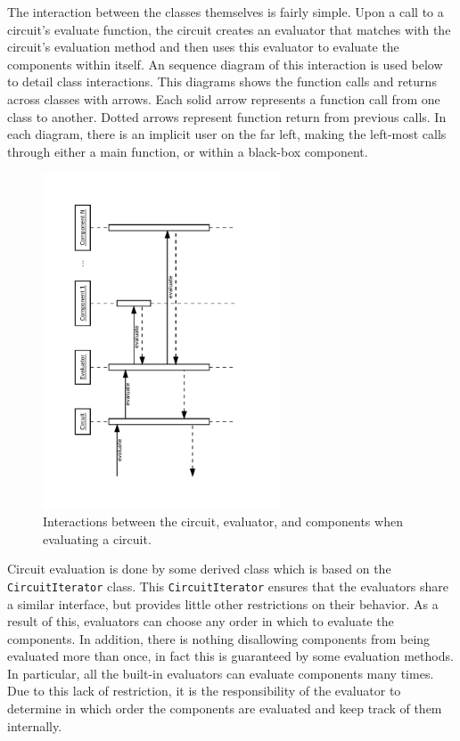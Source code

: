 \documentclass{article}
\newcommand{\ClassName}[1]{\texttt{#1}}
\begin{document}
The interaction between the classes themselves is fairly simple. Upon a call to a circuit's evaluate function, the circuit creates an evaluator that matches with the circuit’s evaluation method and then uses this evaluator to evaluate the components within itself. An sequence diagram of this interaction is used below to detail class interactions. This diagrams shows the function calls and returns across classes with arrows. Each solid arrow represents a function call from one class to another. Dotted arrows represent function return from previous calls. In each diagram, there is an implicit user on the far left, making the left-most calls through either a main function, or within a black-box component.

\begin{figure}[H]
    \begin{center}
        \includegraphics[angle=270,width=200pt]{imgs/CircuitEvaluationInteraction.pdf}
    \end{center}
    \caption{Interactions between the circuit, evaluator, and components when evaluating a circuit.}
\end{figure}

Circuit evaluation is done by some derived class which is based on the \ClassName{CircuitIterator} class. This \ClassName{CircuitIterator} ensures that the evaluators share a similar interface, but provides little other restrictions on their behavior. As a result of this, evaluators can choose any order in which to evaluate the components. In addition, there is nothing disallowing components from being evaluated more than once, in fact this is guaranteed by some evaluation methods. In particular, all the built-in evaluators can evaluate components many times. Due to this lack of restriction, it is the responsibility of the evaluator to determine in which order the components are evaluated and keep track of them internally.
\end{document}
